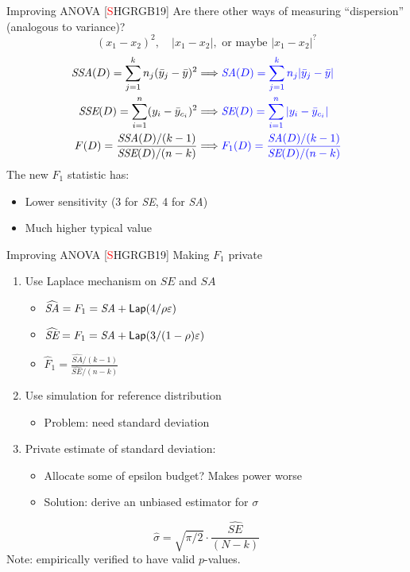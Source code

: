 \documentclass{beamer}
\newcommand{\sse}{\textit{SSE}\xspace}
\newcommand{\ssa}{\textit{SSA}\xspace}
\newcommand{\se}{\textit{SE}\xspace}
\newcommand{\sa}{\textit{SA}\xspace}
\newcommand{\lap}{\ensuremath{{\sf Lap}}\xspace}
\begin{document}
\begin{frame}{Improving ANOVA [\textcolor{red}{S}HGRGB19]}
Are there other ways of measuring ``dispersion'' (analogous to variance)? \pause
$$(x_1 - x_2)^2, \quad \lvert x_1 - x_2 \rvert, \text{ or maybe }\lvert x_1 - x_2 \rvert^?$$ 
\begin{align*}
\ssa(D) = \sum_{j=1}^{k} n_j (\bar{y}_j - \bar{y})^2  &\Longrightarrow \textcolor{blue}{ \sa(D) = \sum_{j=1}^{k} n_j |\bar{y}_j - \bar{y}| }\\  
\sse(D) = \sum_{i=1}^{n}  (y_{i}-\bar{y}_{c_i})^2  &\Longrightarrow \textcolor{blue}{\se(D) = \sum_{i=1}^{n}  |y_{i}-\bar{y}_{c_i}| } \\  
F(D) = \frac{\ssa(D)/(k-1)}{\sse(D)/(n-k)} &\Longrightarrow  \textcolor{blue} {F_1(D) = \frac{\sa(D)/(k-1)}{\se(D)/(n-k)}}
\end{align*}
 \pause
The new $F_1$ statistic has: \pause
\begin{itemize}
\item Lower sensitivity (3 for \se, 4 for \sa) \pause
\item Much higher typical value 
\end{itemize}
\end{frame}



\begin{frame}{Improving ANOVA [\textcolor{red}{S}HGRGB19]}
Making $F_1$ private \pause
\begin{enumerate}
    \item Use Laplace mechanism on $\se$ and $\sa$
    \begin{itemize}
    \item $\widehat{\sa} = F_1 = \sa + \lap(4/\rho\varepsilon)$
    \item $\widehat{\se} = F_1 = \sa + \lap(3/(1-\rho)\varepsilon)$
    \item $\widehat{F}_1 = \frac{\widehat{\sa}/(k-1)}{\widehat{\se}/(n-k)}$
    \end{itemize}
    \item Use simulation for reference distribution
    		\begin{itemize}
       		 \item Problem: need standard deviation \pause
    		\end{itemize}
    \item Private estimate of standard deviation:  
    \begin{itemize}
        \item Allocate some of epsilon budget? \pause Makes power worse \pause
        \item Solution: derive an unbiased estimator for $\sigma$ \pause
    \end{itemize}
\end{enumerate}
\bigskip

$$\hat{\sigma} = \sqrt{\pi/2} \cdot \frac{\widehat{SE}}{(N-k)} $$
\pause
\centering
Note: empirically verified to have valid $p$-values.
\end{frame}
\end{document}

